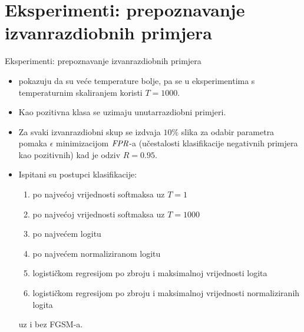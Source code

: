 \documentclass{beamer}
\begin{document}
\section{Eksperimenti: prepoznavanje izvanrazdiobnih primjera}

\begin{frame}{Eksperimenti: prepoznavanje izvanrazdiobnih primjera}
\begin{itemize}
\item \citet{Liang:2017:PDOODENN} pokazuju da su veće temperature bolje, pa se u eksperimentima s temperaturnim skaliranjem koristi $T=1000$.
\item Kao pozitivna klasa se uzimaju unutarrazdiobni primjeri.
\item Za svaki izvanrazdiobni skup se izdvaja $10\%$ slika za odabir parametra pomaka $\epsilon$ minimizacijom $\mathit{FPR}$-a (učestalosti klasifikacije negativnih primjera kao pozitivnih) kad je odziv $R=0.95$. 
\item  Ispitani su postupci klasifikacije:
\begin{enumerate}
	\item po najvećoj vrijednosti softmaksa uz $T=1$ \citep{Hendrycks:2016:BDMOODE}
	\item po najvećoj vrijednosti softmaksa uz $T=1000$ \citep{Liang:2017:PDOODENN}
	\item po najvećem logitu
	\item po najvećem normaliziranom logitu
	\item logističkom regresijom po zbroju i maksimalnoj vrijednosti logita
	\item logističkom regresijom po zbroju i maksimalnoj vrijednosti normaliziranih logita
\end{enumerate}
uz i bez FGSM-a.
\end{itemize}
\end{frame}
\end{document}
